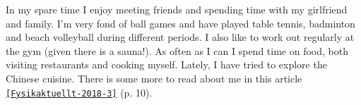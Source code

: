


\begin{cvparagraph}
In my spare time I enjoy meeting friends and spending time with my girlfriend and family.
I'm very fond of ball games and have played table tennis, badminton and beach volleyball during different periods.
I also like to work out regularly at the gym (given there is a sauna!).
As often as I can I spend time on food, both visiting restaurants and cooking myself. 
Lately, I have tried to explore the Chinese cuisine.
There is some more to read about me in this article \href{http://www.fysikersamfundet.se/wp-content/uploads/Fysikaktuellt3-18_Webb.pdf}{\texttt{[Fysikaktuellt-2018-3]}} (p. 10).
\end{cvparagraph}